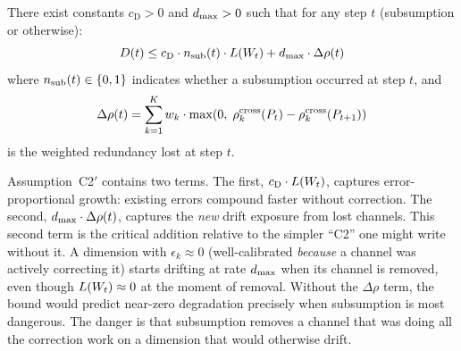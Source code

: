 \begin{assumption}
\label{ass:C2prime}
There exist constants $c_{\mathrm{D}} > 0$ and $d_{\mathrm{max}} > 0$ such that
for any step $t$ (subsumption or otherwise):
\begin{equation}
\label{eq:C2prime}
D(t) \leq c_{\mathrm{D}} \cdot n_{\mathrm{sub}}(t) \cdot L(W_t)
  + d_{\mathrm{max}} \cdot \Delta\rho(t)
\end{equation}
where $n_{\mathrm{sub}}(t) \in \{0,1\}$ indicates whether a subsumption occurred
at step $t$, and
\begin{equation}
\label{eq:delta_rho}
\Delta\rho(t) = \sum_{k=1}^{K} w_k \cdot
  \max\!\left(0,\; \rho^{\mathrm{cross}}_k(P_t) - \rho^{\mathrm{cross}}_k(P_{t+1})\right)
\end{equation}
is the weighted redundancy lost at step $t$.
\end{assumption}

Assumption~C2$'$ contains two terms.  The first, $c_{\mathrm{D}} \cdot
L(W_t)$, captures error-proportional growth: existing errors
compound faster without correction.  The second, $d_{\mathrm{max}} \cdot
\Delta\rho(t)$, captures the \emph{new} drift exposure from lost
channels.  This second term is the critical addition relative to the
simpler ``C2'' one might write without it.  A dimension with
$\epsilon_k \approx 0$ (well-calibrated \emph{because} a channel was
actively correcting it) starts drifting at rate $d_{\mathrm{max}}$ when its
channel is removed, even though $L(W_t) \approx 0$ at the moment
of removal.  Without the $\Delta\rho$ term, the bound would predict
near-zero degradation precisely when subsumption is most dangerous.
The danger is that subsumption removes a channel that was doing all
the correction work on a dimension that would otherwise drift.

